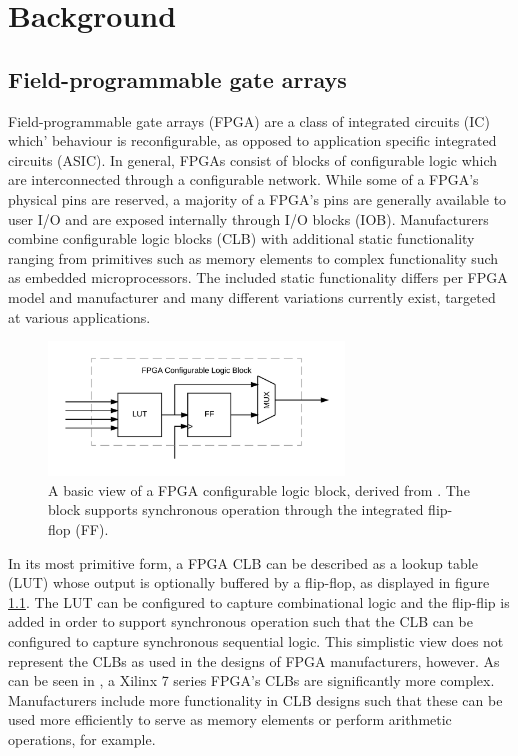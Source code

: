\documentclass[main.tex]{subfiles}
\begin{document}
\chapter{Background}


\section{Field-programmable gate arrays}
Field-programmable gate arrays (FPGA) are a class of integrated circuits (IC) which' behaviour is reconfigurable, as opposed to application specific integrated circuits (ASIC). In general, FPGAs consist of blocks of configurable logic which are interconnected through a configurable network. While some of a FPGA's physical pins are reserved, a majority of a FPGA's pins are generally available to user I/O and are exposed internally through I/O blocks (IOB). Manufacturers combine configurable logic blocks (CLB) with additional static functionality ranging from primitives such as memory elements to complex functionality such as embedded microprocessors. The included static functionality differs per FPGA model and manufacturer and many different variations currently exist, targeted at various applications.

\begin{figure}[h]
    \centering
    \caption{A basic view of a FPGA configurable logic block, derived from \cite{Kallstrom2010fpga}. The block supports synchronous operation through the integrated flip-flop (FF).}
    \label{fig:fpga-clb}
    \includegraphics[width=0.7\textwidth]{img/fpga-clb}
\end{figure}

In its most primitive form, a FPGA CLB can be described as a lookup table (LUT) whose output is optionally buffered by a flip-flop, as displayed in figure \ref{fig:fpga-clb}. The LUT can be configured to capture combinational logic and the flip-flip is added in order to support synchronous operation such that the CLB can be configured to capture synchronous sequential logic. This simplistic view does not represent the CLBs as used in the designs of FPGA manufacturers, however. As can be seen in \cite{ug474}, a Xilinx 7 series FPGA's CLBs are significantly more complex. Manufacturers include more functionality in CLB designs such that these can be used more efficiently to serve as memory elements or perform arithmetic operations, for example.
\end{document}
